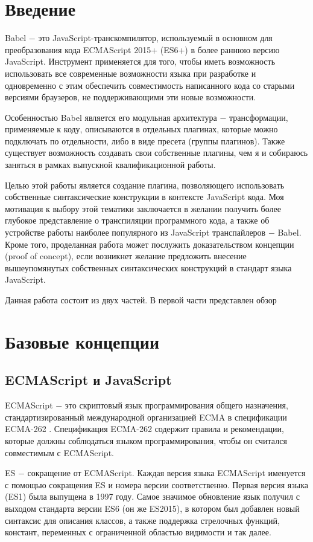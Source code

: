 \documentclass[14pt, a4paper]{article}
\begin{document}

\section*{Введение}
Babel $-$ это JavaScript-транскомпилятор, используемый в основном для преобразования кода ECMAScript 
2015+ (ES6+) в более раннюю версию JavaScript. Инструмент применяется для того, чтобы иметь 
возможность использовать все современные возможности языка при разработке и одновременно с этим 
обеспечить совместимость написанного кода со старыми версиями браузеров, не поддерживающими эти новые 
возможности.

Особенностью Babel является его модульная архитектура $-$ трансформации, применяемые к коду, 
описываются в отдельных плагинах, которые можно подключать по отдельности, либо в виде пресета 
(группы плагинов). Также существует возможность создавать свои собственные плагины, чем я и собираюсь
 заняться в рамках выпускной квалификационной работы.

Целью этой работы является создание плагина, позволяющего использовать собственные синтаксические 
конструкции в контексте JavaScript кода. Моя мотивация к выбору этой тематики заключается в желании 
получить более глубокое представление о транспиляции программного кода, а также об устройстве работы 
наиболее популярного из JavaScript транспайлеров $-$ Babel. Кроме того, проделанная работа может 
послужить доказательством концепции (proof of concept), если возникнет желание предложить внесение 
вышеупомянутых собственных синтаксических конструкций в стандарт языка JavaScript.

Данная работа состоит из двух частей. В первой части представлен обзор

\pagebreak
\section{Базовые концепции}
\subsection{ECMAScript и JavaScript}
ECMAScript $-$ это скриптовый язык программирования общего назначения, стандартизированный международной 
организацией ECMA в спецификации ECMA-262 \cite{ecma-262}. Спецификация ECMA-262 содержит правила и рекомендации, 
которые должны соблюдаться языком программирования, чтобы он считался совместимым с ECMAScript.

ES $-$ сокращение от ECMAScript. Каждая версия языка ECMAScript именуется с помощью сокращения ES и 
номера версии соответственно. Первая версия языка (ES1)  была выпущена в 1997 году. Самое значимое 
обновление язык получил с выходом стандарта версии ES6 (он же ES2015), в котором был добавлен новый 
синтаксис для описания классов, а также поддержка стрелочных функций, констант,  переменных с ограниченной областью 
видимости и так далее.
\end{document}
